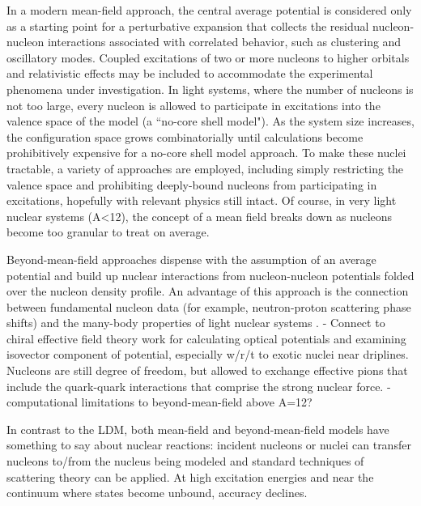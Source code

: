 In a modern mean-field approach, the central average potential is considered
only as a starting point for a perturbative
expansion that collects the residual nucleon-nucleon interactions associated with
correlated behavior, such as clustering and oscillatory modes. Coupled excitations of
two or more nucleons to higher orbitals and relativistic effects may be included to 
accommodate the experimental phenomena under investigation.
In light systems, where the number of nucleons is not too large, every nucleon is
allowed to participate in excitations into the valence space of the model
(a ``no-core shell model"). As the system size increases, the configuration space grows
combinatorially until calculations become prohibitively expensive for a no-core
shell model approach. To make these nuclei tractable, a variety of approaches
are employed, including simply restricting the valence space and prohibiting deeply-bound 
nucleons from participating in excitations, hopefully with relevant physics
still intact. Of course, in very light nuclear systems (A<12), the concept of a
mean field breaks down as nucleons become too granular to treat on average.


Beyond-mean-field approaches dispense with the assumption of an average
potential and build up nuclear interactions from nucleon-nucleon potentials
folded over the nucleon density profile. An advantage
of this approach is the connection between fundamental nucleon data
(for example, neutron-proton scattering phase shifts) and the many-body
properties of light nuclear systems \cite{Wiringa}.
- Connect to chiral effective field theory work for calculating optical potentials
and examining isovector component of potential, especially w/r/t to exotic
nuclei near driplines. Nucleons are still degree of freedom, but allowed to exchange effective 
pions that include the quark-quark interactions that comprise the strong nuclear force.
- computational limitations to beyond-mean-field above A=12?

In contrast to the LDM, both mean-field and beyond-mean-field models have
something to say about nuclear reactions: incident nucleons or nuclei can
transfer nucleons to/from the nucleus being modeled and standard
techniques of scattering theory can be applied.
At high excitation energies and near the continuum where states become
unbound, accuracy declines.

